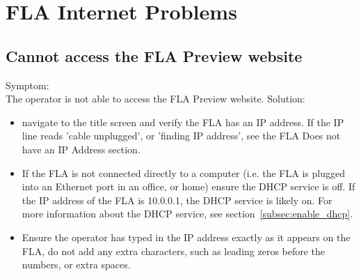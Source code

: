 \documentclass[11pt, oneside]{book}
\begin{document}
\section{FLA Internet Problems}
\subsection{Cannot access the FLA Preview website}
Symptom:\\
The operator is not able to access the FLA Preview website.
Solution:\\
\begin{itemize}
\item navigate to the title screen and verify the FLA has an IP address. If the IP line reads 'cable unplugged', or 'finding IP address', see the FLA Does not have an IP Address section.
\item If the FLA is not connected directly to a computer (i.e. the FLA is plugged into an Ethernet port in an office, or home) ensure the DHCP service is off. If the IP address of the FLA is 10.0.0.1, the DHCP service is likely on. For more information about the DHCP service, see section~\ref{subsec:enable_dhcp}.
\item Ensure the operator has typed in the IP address exactly as it appears on the FLA, do not add any extra characters, such as leading zeros before the numbers, or extra spaces.
\end{itemize}
\end{document}
